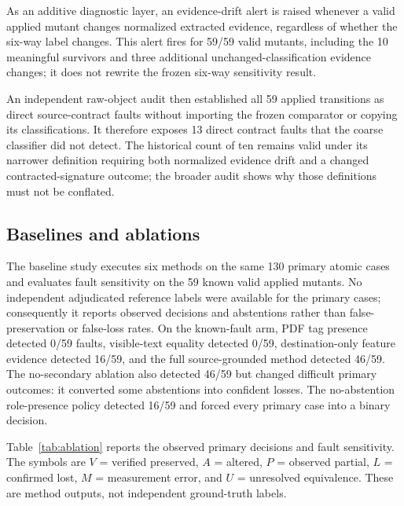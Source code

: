 As an additive diagnostic layer, an evidence-drift alert is raised whenever a valid applied mutant changes normalized extracted evidence, regardless of whether the six-way label changes. This alert fires for 59/59 valid mutants, including the 10 meaningful survivors and three additional unchanged-classification evidence changes; it does not rewrite the frozen six-way sensitivity result.

An independent raw-object audit then established all 59 applied transitions as direct source-contract faults without importing the frozen comparator or copying its classifications. It therefore exposes 13 direct contract faults that the coarse classifier did not detect. The historical count of ten remains valid under its narrower definition requiring both normalized evidence drift and a changed contracted-signature outcome; the broader audit shows why those definitions must not be conflated.

\subsection{Baselines and ablations}
The baseline study executes six methods on the same 130 primary atomic cases and evaluates fault sensitivity on the 59 known valid applied mutants. No independent adjudicated reference labels were available for the primary cases; consequently it reports observed decisions and abstentions rather than false-preservation or false-loss rates. On the known-fault arm, PDF tag presence detected 0/59 faults, visible-text equality detected 0/59, destination-only feature evidence detected 16/59, and the full source-grounded method detected 46/59. The no-secondary ablation also detected 46/59 but changed difficult primary outcomes: it converted some abstentions into confident losses. The no-abstention role-presence policy detected 16/59 and forced every primary case into a binary decision.

Table~\ref{tab:ablation} reports the observed primary decisions and fault sensitivity. The symbols are $V$ = verified preserved, $A$ = altered, $P$ = observed partial, $L$ = confirmed lost, $M$ = measurement error, and $U$ = unresolved equivalence. These are method outputs, not independent ground-truth labels.


